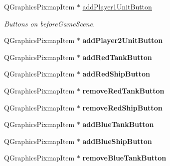 \begin{DoxyCompactItemize}
\item 
Q\+Graphics\+Pixmap\+Item $\ast$ \hyperlink{class_game_menu_aedcd8869665d66f9489ab41f0c038df8}{add\+Player1\+Unit\+Button}\hypertarget{class_game_menu_aedcd8869665d66f9489ab41f0c038df8}{}\label{class_game_menu_aedcd8869665d66f9489ab41f0c038df8}

\begin{DoxyCompactList}\small\item\em Buttons on before\+Game\+Scene. \end{DoxyCompactList}\item 
Q\+Graphics\+Pixmap\+Item $\ast$ {\bfseries add\+Player2\+Unit\+Button}\hypertarget{class_game_menu_a1027a5d9f67523cee6782d6413a75281}{}\label{class_game_menu_a1027a5d9f67523cee6782d6413a75281}

\item 
Q\+Graphics\+Pixmap\+Item $\ast$ {\bfseries add\+Red\+Tank\+Button}\hypertarget{class_game_menu_aab61d7c4576ad32880dd7ef88ed20ec8}{}\label{class_game_menu_aab61d7c4576ad32880dd7ef88ed20ec8}

\item 
Q\+Graphics\+Pixmap\+Item $\ast$ {\bfseries add\+Red\+Ship\+Button}\hypertarget{class_game_menu_a37bec2390eed30904e9c3a8ba96cc300}{}\label{class_game_menu_a37bec2390eed30904e9c3a8ba96cc300}

\item 
Q\+Graphics\+Pixmap\+Item $\ast$ {\bfseries remove\+Red\+Tank\+Button}\hypertarget{class_game_menu_a27d6aaab28d7b33fe1838a3bfd99d6b4}{}\label{class_game_menu_a27d6aaab28d7b33fe1838a3bfd99d6b4}

\item 
Q\+Graphics\+Pixmap\+Item $\ast$ {\bfseries remove\+Red\+Ship\+Button}\hypertarget{class_game_menu_aa3d84cd45a3fcb796c3f7e558dffdfc7}{}\label{class_game_menu_aa3d84cd45a3fcb796c3f7e558dffdfc7}

\item 
Q\+Graphics\+Pixmap\+Item $\ast$ {\bfseries add\+Blue\+Tank\+Button}\hypertarget{class_game_menu_a3bad751deea1957b875bdbda8543429b}{}\label{class_game_menu_a3bad751deea1957b875bdbda8543429b}

\item 
Q\+Graphics\+Pixmap\+Item $\ast$ {\bfseries add\+Blue\+Ship\+Button}\hypertarget{class_game_menu_a96db625de02a04609bef8a13a663110d}{}\label{class_game_menu_a96db625de02a04609bef8a13a663110d}

\item 
Q\+Graphics\+Pixmap\+Item $\ast$ {\bfseries remove\+Blue\+Tank\+Button}\hypertarget{class_game_menu_ac2e4f8f3a0a760347ce8aae8a3471c48}{}\label{class_game_menu_ac2e4f8f3a0a760347ce8aae8a3471c48}


\end{DoxyCompactItemize}
